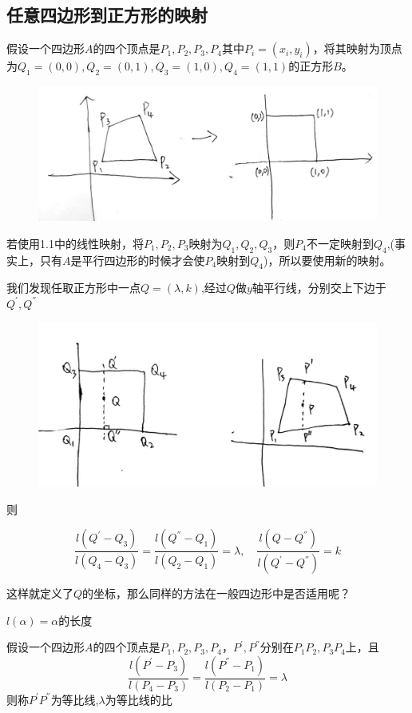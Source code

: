 \documentclass[12pt,a4paper]{article}
\begin{document}
\subsection{ 任意四边形到正方形的映射}
假设一个四边形$A$的四个顶点是$P_1,P_2,P_3,P_4$其中$P_i=(x_i,y_i)$，将其映射为顶点为$Q_1=(0,0),Q_2=(0,1),Q_3=(1,0),Q_4=(1,1)$的正方形$B$。
\begin{figure}[H]
\centering
\includegraphics[scale=0.15]{./figures/Figure_2.jpg}
\end{figure}
若使用1.1中的线性映射，将$P_1,P_2,P_3$映射为$Q_1,Q_2,Q_3$，则$P_4$不一定映射到$Q_4$,(事实上，只有$A$是平行四边形的时候才会使$P_4$映射到$Q_4$)，所以要使用新的映射。

我们发现任取正方形中一点$Q=(\lambda,k)$,经过$Q$做$y$轴平行线，分别交上下边于$Q^{'},Q^{''}$
\begin{figure}[H]
\centering
\includegraphics[scale=0.12]{./figures/Figure_3.jpg}
\end{figure}
则

$$
\frac{l(Q^{'}-Q_3)}{l(Q_4-Q_3)} =\frac{l(Q^{''}-Q_1)}{l(Q_2-Q_1)}=\lambda,\quad \frac{l(Q-Q^{''})}{l(Q^{'}-Q^{''})}=k  
$$

这样就定义了$Q$的坐标，那么同样的方法在一般四边形中是否适用呢？
\begin{definition}
$l(\alpha)=\alpha$的长度
\end{definition}

\begin{definition}
假设一个四边形$A$的四个顶点是$P_1,P_2,P_3,P_4$，$P^{'},P^{''}$分别在$P_1P_2,P_3P_4$上，且
$$
\frac{l(P^{'}-P_3)}{l(P_4-P_3)} =\frac{l(P^{''}-P_1)}{l(P_2-P_1)}=\lambda
$$
则称$P^{'}P^{''}$为等比线,$\lambda$为等比线的比
\end{definition}
\end{document}
